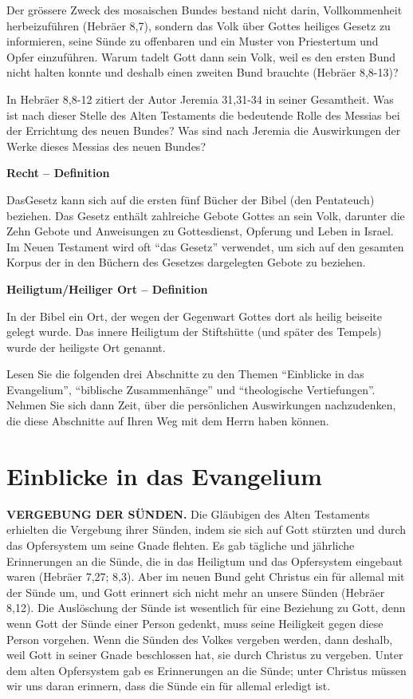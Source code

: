 \documentclass[
  12pt,
]{krantz}
\makeatletter
\newenvironment{kframe}{%
\medskip{}
\setlength{\fboxsep}{.8em}
 \def\at@end@of@kframe{}%
 \ifinner\ifhmode%
  \def\at@end@of@kframe{\end{minipage}}%
  \begin{minipage}{\columnwidth}%
 \fi\fi%
 \def\FrameCommand##1{\hskip\@totalleftmargin \hskip-\fboxsep
 \colorbox{shadecolor}{##1}\hskip-\fboxsep
     \hskip-\linewidth \hskip-\@totalleftmargin \hskip\columnwidth}%
 \MakeFramed {\advance\hsize-\width
   \@totalleftmargin\z@ \linewidth\hsize
   \@setminipage}}%
 {\par\unskip\endMakeFramed%
 \at@end@of@kframe}
\newenvironment{rmdblock}[1]
  {
  \begin{itemize}
  \renewcommand{\labelitemi}{
    \raisebox{-.7\height}[0pt][0pt]{
      {\setkeys{Gin}{width=3em,keepaspectratio}\texttt{[image: img/\#1]}}
    }
  }
  \setlength{\fboxsep}{1em}
  \begin{kframe}
  \item
  }
  {
  \end{kframe}
  \end{itemize}
  }
\newenvironment{rmddefinition}
  {\begin{rmdblock}{definition}}
  {\end{rmdblock}}
\makeatother
\begin{document}
Der grössere Zweck des mosaischen Bundes bestand nicht darin, Vollkommenheit herbeizuführen (Hebräer 8,7), sondern das Volk über Gottes heiliges Gesetz zu informieren, seine Sünde zu offenbaren und ein Muster von Priestertum und Opfer einzuführen. Warum tadelt Gott dann sein Volk, weil es den ersten Bund nicht halten konnte und deshalb einen zweiten Bund brauchte (Hebräer 8,8-13)?

In Hebräer 8,8-12 zitiert der Autor Jeremia 31,31-34 in seiner Gesamtheit. Was ist nach dieser Stelle des Alten Testaments die bedeutende Rolle des Messias bei der Errichtung des neuen Bundes? Was sind nach Jeremia die Auswirkungen der Werke dieses Messias des neuen Bundes?

\begin{rmddefinition}
\textbf{Recht -- Definition}

DasGesetz kann sich auf die ersten fünf Bücher der Bibel (den
Pentateuch) beziehen. Das Gesetz enthält zahlreiche Gebote Gottes an
sein Volk, darunter die Zehn Gebote und Anweisungen zu Gottesdienst,
Opferung und Leben in Israel. Im Neuen Testament wird oft ``das Gesetz''
verwendet, um sich auf den gesamten Korpus der in den Büchern des
Gesetzes dargelegten Gebote zu beziehen.
\end{rmddefinition}

\begin{rmddefinition}
\textbf{Heiligtum/Heiliger Ort -- Definition}

In der Bibel ein Ort, der wegen der Gegenwart Gottes dort als heilig
beiseite gelegt wurde. Das innere Heiligtum der Stiftshütte (und später
des Tempels) wurde der heiligste Ort genannt.
\end{rmddefinition}

Lesen Sie die folgenden drei Abschnitte zu den Themen ``Einblicke in das Evangelium'', ``biblische Zusammenhänge'' und ``theologische Vertiefungen''. Nehmen Sie sich dann Zeit, über die persönlichen Auswirkungen nachzudenken, die diese Abschnitte auf Ihren Weg mit dem Herrn haben können.

\hypertarget{einblicke-in-das-evangelium}{%
\section{Einblicke in das Evangelium}\label{einblicke-in-das-evangelium}}

\textbf{VERGEBUNG DER SÜNDEN.} Die Gläubigen des Alten Testaments erhielten die Vergebung ihrer Sünden, indem sie sich auf Gott stürzten und durch das Opfersystem um seine Gnade flehten. Es gab tägliche und jährliche Erinnerungen an die Sünde, die in das Heiligtum und das Opfersystem eingebaut waren (Hebräer 7,27; 8,3). Aber im neuen Bund geht Christus ein für allemal mit der Sünde um, und Gott erinnert sich nicht mehr an unsere Sünden (Hebräer 8,12). Die Auslöschung der Sünde ist wesentlich für eine Beziehung zu Gott, denn wenn Gott der Sünde einer Person gedenkt, muss seine Heiligkeit gegen diese Person vorgehen. Wenn die Sünden des Volkes vergeben werden, dann deshalb, weil Gott in seiner Gnade beschlossen hat, sie durch Christus zu vergeben. Unter dem alten Opfersystem gab es Erinnerungen an die Sünde; unter Christus müssen wir uns daran erinnern, dass die Sünde ein für allemal erledigt ist.
\end{document}
